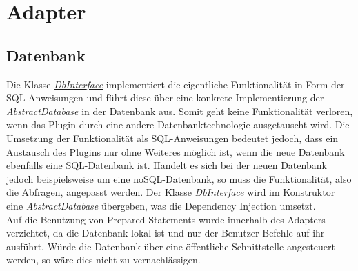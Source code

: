\section{Adapter}
\subsection{Datenbank}
Die Klasse \href{https://github.com/moorts/Morik/blob/main/src/application/DbInterface.h}{\textit{DbInterface}} implementiert die eigentliche Funktionalität in Form der SQL-Anweisungen und führt diese über eine konkrete Implementierung der \textit{AbstractDatabase} in der Datenbank aus. Somit geht keine Funktionalität verloren, wenn das Plugin durch eine andere Datenbanktechnologie ausgetauscht wird. Die Umsetzung der Funktionalität als SQL-Anweisungen bedeutet jedoch, dass ein Austausch des Plugins nur ohne Weiteres möglich ist, wenn die neue Datenbank ebenfalls eine SQL-Datenbank ist. Handelt es sich bei der neuen Datenbank jedoch beispielsweise um eine noSQL-Datenbank, so muss die Funktionalität, also die Abfragen, angepasst werden. Der Klasse \textit{DbInterface} wird im Konstruktor eine \textit{AbstractDatabase} übergeben, was die Dependency Injection umsetzt.\\
Auf die Benutzung von Prepared Statements wurde innerhalb des Adapters verzichtet, da die Datenbank lokal ist und nur der Benutzer Befehle auf ihr ausführt. Würde die Datenbank über eine öffentliche Schnittstelle angesteuert werden, so wäre dies nicht zu vernachlässigen.
